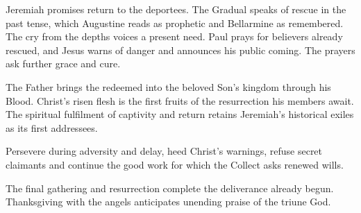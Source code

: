 \begin{fourSenses}
\item[Literal.] Jeremiah promises return to the deportees. The Gradual
speaks of rescue in the past tense, which Augustine reads as prophetic
and Bellarmine as remembered. The cry from the depths voices a present
need. Paul prays for believers already rescued, and Jesus warns of danger
and announces his public coming. The prayers ask further grace and cure.
\item[Allegorical.] The Father brings the redeemed into the
beloved Son's kingdom through his Blood. Christ's risen flesh
is the first fruits of the resurrection his members await.
The spiritual fulfilment of captivity and return retains
Jeremiah's historical exiles as its first addressees.
\item[Moral.] Persevere during adversity and delay, heed
Christ's warnings, refuse secret claimants and continue the
good work for which the Collect asks renewed wills.
\item[Anagogical.] The final gathering and resurrection
complete the deliverance already begun. Thanksgiving with
the angels anticipates unending praise of the triune God.
\end{fourSenses}
